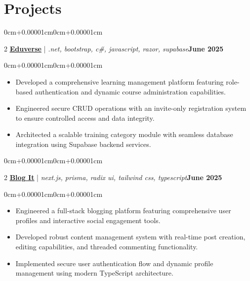\documentclass[11pt, letterpaper]{article}
\newenvironment{highlights}{\begin{itemize}[topsep=0.10cm,parsep=0.10cm,partopsep=0pt,itemsep=0pt,leftmargin=0cm+12pt]}{\end{itemize}}
\newenvironment{onecolentry}{\begin{adjustwidth}{0cm+0.00001cm}{0cm+0.00001cm}}{\end{adjustwidth}}
\newenvironment{twocolentry}[2][]{\onecolentry\def\secondColumn{#2}\setcolumnwidth{\fill,5.5cm}\begin{paracol}{2}}{\switchcolumn \raggedleft \secondColumn\end{paracol}\endonecolentry}
\let\hrefWithoutArrow\href
\begin{document}
\section{Projects}
    \begin{twocolentry}{\textbf{June 2025}}
        \textbf{\textcolor{blue}{\underline{\hrefWithoutArrow{https://github.com/jlescarlan11/Eduverse}{Eduverse}}}} | \textit{.net, bootstrap, c\#, javascript, razor, supabase}\end{twocolentry}
    \vspace{0.10cm}
    \begin{onecolentry}
        \begin{highlights}
            \item Developed a comprehensive learning management platform featuring role-based authentication and dynamic course administration capabilities.
            \item Engineered secure CRUD operations with an invite-only registration system to ensure controlled access and data integrity.
            \item Architected a scalable training category module with seamless database integration using Supabase backend services.
        \end{highlights}
    \end{onecolentry}
    \vspace{0.15cm}
    \begin{twocolentry}{\textbf{June 2025}}
        \textbf{\textcolor{blue}{\underline{\hrefWithoutArrow{https://github.com/jlescarlan11/sutta-blogs}{Blog It}}}} | \textit{next.js, prisma, radix ui, tailwind css, typescript}\end{twocolentry}
    \vspace{0.10cm}
    \begin{onecolentry}
        \begin{highlights}
            \item Engineered a full-stack blogging platform featuring comprehensive user profiles and interactive social engagement tools.
            \item Developed robust content management system with real-time post creation, editing capabilities, and threaded commenting functionality.
            \item Implemented secure user authentication flow and dynamic profile management using modern TypeScript architecture.
        \end{highlights}
    \end{onecolentry}
\end{document}
